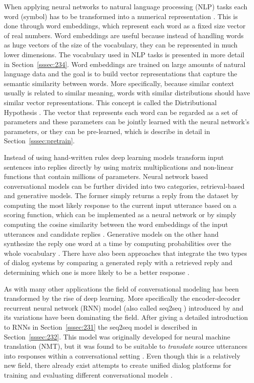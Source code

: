\documentclass[12pt]{article}
\begin{document}
When applying neural networks to natural language processing (NLP) tasks each word (symbol) has to be transformed into a numerical representation \cite{Bengio:2003}. This is done through word embeddings, which represent each word as a fixed size vector of real numbers. Word embeddings are useful because instead of handling words as huge vectors of the size of the vocabulary, they can be represented in much lower dimensions. The vocabulary used in NLP tasks is presented in more detail in Section~\ref{sssec:234}. Word embeddings are trained on large amounts of natural language data and the goal is to build vector representations that capture the semantic similarity between words. More specifically, because similar context usually is related to similar meaning, words with similar distributions should have similar vector representations. This concept is called the Distributional Hypothesis \cite{Harris:1954}. The vector that represents each word can be regarded as a set of parameters and these parameters can be jointly learned with the neural network's parameters, or they can be pre-learned, which is describe in detail in Section~\ref{sssec:pretrain}.

Instead of using hand-written rules deep learning models transform input sentences into replies directly by using matrix multiplications and non-linear functions that contain millions of parameters. Neural network based conversational models can be further divided into two categories, retrieval-based and generative models. The former simply returns a reply from the dataset by computing the most likely response to the current input utterance based on a scoring function, which can be implemented as a neural network \cite{Cho:2014} or by simply computing the cosine similarity between the word embeddings of the input utterances and candidate replies \cite{stalemate:2016}. Generative models on the other hand synthesize the reply one word at a time by computing probabilities over the whole vocabulary \cite{Sutskever:2014,Vinyals:2015}. There have also been approaches that integrate the two types of dialog systems by comparing a generated reply with a retrieved reply and determining which one is more likely to be a better response \cite{Song:2016}.

As with many other applications the field of conversational modeling has been transformed by the rise of deep learning. More specifically the encoder-decoder recurrent neural network (RNN) model (also called seq2seq \cite{Sutskever:2014}) introduced by \cite{Cho:2014} and its variations have been dominating the field. After giving a detailed introduction to RNNs in Section~\ref{sssec:231} the seq2seq model is described in Section~\ref{sssec:232}. This model was originally developed for neural machine translation (NMT), but it was found to be suitable to \textit{translate} source utterances into responses within a conversational setting \cite{Shang:2015,Vinyals:2015}. Even though this is a relatively new field, there already exist attempts to create unified dialog platforms for training and evaluating different conversational models \cite{Miller:2017}.
\end{document}
